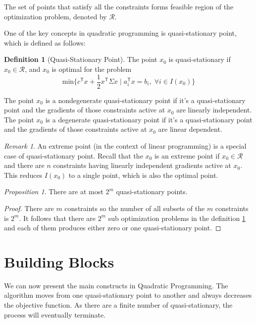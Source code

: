 \documentclass[letterpaper, oneside]{book}
\theoremstyle{definition}
\newtheorem{definition}{Definition}[chapter]
\theoremstyle{remark}
\newtheorem*{remark}{Remark}
\newtheorem{prop}{Proposition}[chapter]
\begin{document}
The set of points that satisfy all the constraints forms feasible region of the optimization problem, denoted by $\mathcal{R}$.

One of the key concepts in quadratic programming is quasi-stationary point, which is defined as follows:

\begin{definition}[Quasi-Stationary Point]\label{def_quasi_stationary_point}
	The point $x_0$ is quasi-stationary if $x_0\in \mathcal{R}$, and $x_0$ is optimal for the problem
	\begin{displaymath}
		\textrm{min}\{c^{\mathsf{T}}x + \frac{1}{2}x^{\mathsf{T}}\Sigma{}x \;|\; a_i^{\mathsf{T}}x=b_i, \;\forall i \in I(x_0)  \}
	\end{displaymath}
\end{definition}

The point $x_0$ is a nondegenerate quasi-stationary point if it's a quasi-stationary point and the gradients of those constraints active at $x_0$ are linearly independent. The point $x_0$ is a degenerate quasi-stationary point if it's a quasi-stationary point and the gradients of those constraints active at $x_0$ are linear dependent.

\begin{remark}
	An extreme point (in the context of linear programming) is a special case of quasi-stationary point. Recall that the $x_0$ is an extreme point if $x_0 \in \mathcal{R}$ and there are $n$ constraints having linearly independent gradients active at $x_0$. This reduces $I(x_0)$ to a single point, which is also the optimal point.
\end{remark}
\begin{prop}
	There are at most $2^m$ quasi-stationary points.
\end{prop}

\begin{proof}
	There are $m$ constraints so the number of all subsets of the $m$ constraints is $2^m$. It follows that there are $2^m$ sub optimization problems in the definition \ref{def_quasi_stationary_point} and each of them produces either zero or one quasi-stationary point.
\end{proof}



\section{Building Blocks}

We can now present the main constructs in Quadratic Programming. The algorithm moves from one quasi-stationary point to another and always decreases the objective function. As there are a finite number of quasi-stationary, the process will eventually terminate.
\end{document}
